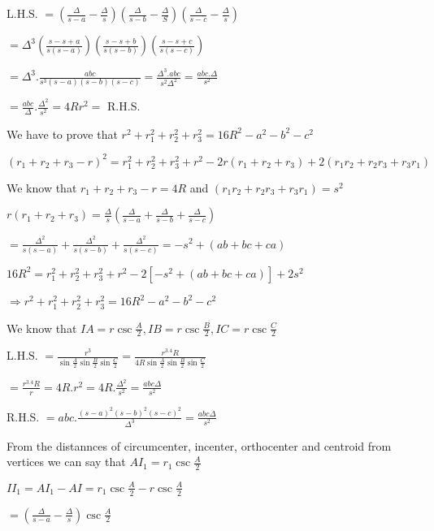   L.H.S. $= \left(\frac{\Delta}{s - a} - \frac{\Delta}{s}\right)\left(\frac{\Delta}{s - b} -
  \frac{\Delta}{S}\right)\left(\frac{\Delta}{s - c} - \frac{\Delta}{s}\right)$

  $= \Delta^3\left(\frac{s - s + a}{s(s - a)}\right)\left(\frac{s - s + b}{s(s - b)}\right)\left(\frac{s - s + c}{s(s -
    c)}\right)$

  $= \Delta^3.\frac{abc}{s^3(s - a)(s - b)(s - c)} = \frac{\Delta^3.abc}{s^2\Delta^2} = \frac{abc.\Delta}{s^2}$

  $= \frac{abc}{\Delta}.\frac{\Delta^2}{s^2} = 4Rr^2 =$ R.H.S.

\item We have to prove that $r^2 + r_1^2 + r_2^2 + r_3^2 = 16R^2 - a^2 - b^2 - c^2$

  $(r_1 + r_2 + r_3 - r)^2 = r_1^2 + r_2^2 + r_3^2 + r^2 - 2r(r_1 + r_2 + r_3) + 2(r_1r_2 + r_2r_3 + r_3r_1)$

  We know that $r_1 + r_2 + r_3 - r = 4R$ and $(r_1r_2 + r_2r_3 + r_3r_1) = s^2$

  $r(r_1 + r_2 + r_3) = \frac{\Delta}{s}\left(\frac{\Delta}{s -a} + \frac{\Delta}{s - b} + \frac{\Delta}{s - c}\right)$

  $= \frac{\Delta^2}{s(s - a)} + \frac{\Delta^2}{s(s - b)} + \frac{\Delta^2}{s(s - c)} = -s^2 + (ab + bc + ca)$

  $16R^2 = r_1^2 + r_2^2 + r_3^2 + r^2 -2[-s^2 + (ab + bc + ca)] + 2s^2$

  $\Rightarrow r^2 + r_1^2 + r_2^2 + r_3^2 = 16R^2 - a^2 - b^2 - c^2$

\item We know that $IA = r\csc\frac{A}{2}, IB=r\csc\frac{B}{2}, IC=r\csc\frac{C}{2}$

  L.H.S. $= \frac{r^3}{\sin\frac{A}{2}\sin\frac{B}{2}\sin\frac{C}{2}} =
  \frac{r^3.4R}{4R\sin\frac{A}{2}\sin\frac{B}{2}\sin\frac{C}{2}}$

  $= \frac{r^3.4R}{r} = 4R.r^2 = 4R.\frac{\Delta^2}{s^2} = \frac{abc\Delta}{s^2}$

  R.H.S. $= abc.\frac{(s - a)^2(s - b)^2(s - c)^2}{\Delta^3} = \frac{abc\Delta}{s^2}$

\item From the distannces of circumcenter, incenter, orthocenter and centroid from vertices we can
  say that $AI_1 = r_1\csc\frac{A}{2}$

\item $II_1 = AI_1 - AI = r_1\csc\frac{A}{2} - r\csc\frac{A}{2}$

  $= \left(\frac{\Delta}{s - a} - \frac{\Delta}{s}\right)\csc\frac{A}{2}$

